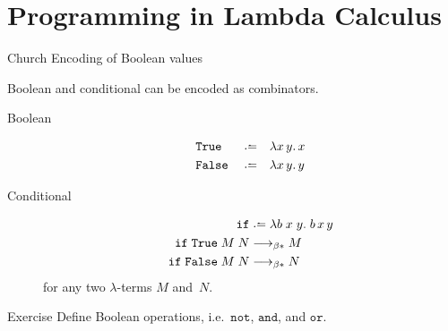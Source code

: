 \section{Programming in Lambda Calculus}
\begin{frame}{Church Encoding of Boolean values}
  
Boolean and conditional can be encoded as combinators.
  
\begin{description}
  \item[Boolean]
    \begin{align*}
      & \mathtt{True}  && \defeq && \lambda x\,y.\, x \\
      & \mathtt{False} && \defeq && \lambda x\,y.\, y
    \end{align*}

  \item[Conditional]
    \begin{align*}
      \mathtt{if} & \defeq \lambda b\;x\;y.\;b\,x\,y  \\
      \mathtt{if} \;\mathtt{True} \;M\;N &\reduce M \\
      \mathtt{if} \;\mathtt{False}\;M\;N &\reduce N
    \end{align*}
    for any two $\lambda$-terms $M$ and~$N$.
\end{description}
\begin{block}{Exercise}
  Define Boolean operations, i.e.\ $\mathtt{not}$, $\mathtt{and}$, and
  $\mathtt{or}$. 
\end{block}

\end{frame}

